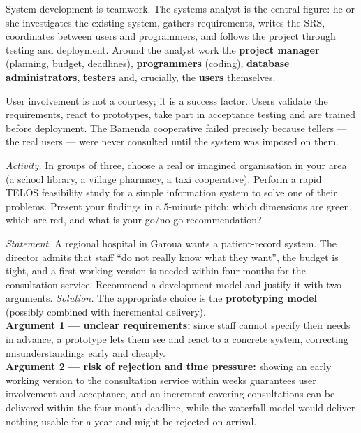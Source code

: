 \documentclass[11pt]{article}
\newcommand{\cle}[1]{{\popxbold\color{popdark}#1}}
\newcounter{popsec}
\newcounter{popsub}
\newcommand{\courssub}[1]{%
  \stepcounter{popsub}%
  \par\vspace{9pt}\noindent{\popxbold\fontsize{11.5}{13}\selectfont\color{popink}{\color{poporange}\thepopsec.\thepopsub}\hspace{6pt}#1}\par\nopagebreak\vspace{4pt}
}
\begin{document}
\courssub{The Project Team and User Involvement}

System development is teamwork. The \cle{systems analyst} is the central figure: he or she investigates the existing system, gathers requirements, writes the SRS, coordinates between users and programmers, and follows the project through testing and deployment. Around the analyst work the \textbf{project manager} (planning, budget, deadlines), \textbf{programmers} (coding), \textbf{database administrators}, \textbf{testers} and, crucially, the \textbf{users} themselves.

User involvement is not a courtesy; it is a success factor. Users validate the requirements, react to prototypes, take part in acceptance testing and are trained before deployment. The Bamenda cooperative failed precisely because tellers --- the real users --- were never consulted until the system was imposed on them.

\begin{experience}
\emph{Activity.} In groups of three, choose a real or imagined organisation in your area (a school library, a village pharmacy, a taxi cooperative). Perform a rapid TELOS feasibility study for a simple information system to solve one of their problems. Present your findings in a 5-minute pitch: which dimensions are green, which are red, and what is your go/no-go recommendation?
\end{experience}

\begin{exoresolu}
\emph{Statement.} A regional hospital in Garoua wants a patient-record system. The director admits that staff ``do not really know what they want'', the budget is tight, and a first working version is needed within four months for the consultation service. Recommend a development model and justify it with two arguments.
\tcblower
\emph{Solution.} The appropriate choice is the \textbf{prototyping model} (possibly combined with incremental delivery).\\
\textbf{Argument 1 --- unclear requirements:} since staff cannot specify their needs in advance, a prototype lets them see and react to a concrete system, correcting misunderstandings early and cheaply.\\
\textbf{Argument 2 --- risk of rejection and time pressure:} showing an early working version to the consultation service within weeks guarantees user involvement and acceptance, and an increment covering consultations can be delivered within the four-month deadline, while the waterfall model would deliver nothing usable for a year and might be rejected on arrival.
\end{exoresolu}
\end{document}
